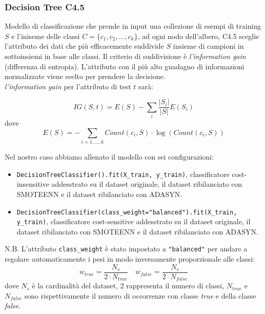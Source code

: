 \documentclass[italian,12pt,a4paper]{article}
\begin{document}
	\subsubsection{Decision Tree C4.5}
	Modello di classificazione che prende in input una collezione di esempi di training $S$ e l'iniseme delle classi $C = \{c_1, c_2, \dots, c_k\}$, ad ogni nodo dell'albero, C4.5 sceglie l'attributo dei dati che più efficacemente suddivide $S$ insieme di campioni in sottoinsiemi in base alle classi. Il criterio di suddivisione è \textit{l'information gain} (differenza di entropia). L'attributo con il più alto guadagno di informazioni normalizzate viene scelto per prendere la decisione. \\
	\textit{l'information gain} per l'attributo di test $t$ sarà:
	
	$$IG(S, t) = E(S) - \sum_i \frac{|S_i|}{|S|}E(S_i)$$ dove $$E(S) = -\sum_{i = 1, \dots, k} Count(c_i, S)\cdot\log(Count(c_i, S))$$
	
	Nel nostro caso abbiamo allenato il modello con sei configurazioni:
	
	\begin{itemize}
		\item \texttt{DecisionTreeClassifier().fit(X\_train, y\_train)}, classificatore cost-insensitive addesstrato su il dataset originale, il dataset ribilanciato con SMOTEENN e il dataset ribilanciato con ADASYN.
		\item \texttt{DecisionTreeClassifier(class\_weight="balanced").fit(X\_train, y\_train)}, classificatore cost-sensitive addesstrato su il dataset originale, il dataset ribilanciato con SMOTEENN e il dataset ribilanciato con ADASYN.
		
	\end{itemize}
	
	N.B. L'attributo \texttt{class\_weight} è stato impostato a \texttt{"balanced"} per andare a regolare automaticamente i pesi in modo inversamente proporzionale alle classi: $$w_{true} = \frac{N_s}{2\cdot N_{true}} \quad w_{false} = \frac{N_s}{2\cdot N_{false}}$$ dove $N_s$ è la cardinalità del dataset, $2$ rappresenta il numero di classi, $N_{true}$ e $N_{false}$ sono rispettivamente il numero di occorrenze con classe \textit{true} e della classe \textit{false}.
	
	
	
\end{document}
